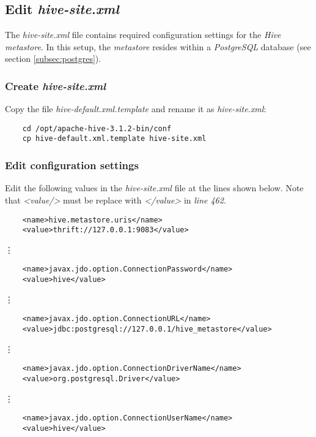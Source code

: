 \documentclass{article}
\begin{document}
  \subsection{Edit \emph{hive-site.xml}}
  The \emph{hive-site.xml} file contains required configuration settings for the
  \emph{Hive metastore}. In this setup, the \emph{metastore} resides within a \emph{PostgreSQL}
  database (see section \ref{subsec:postgres}).

    \subsubsection{Create \emph{hive-site.xml}}
    Copy the file \emph{hive-default.xml.template} and rename it as \emph{hive-site.xml}:
    \begin{verbatim}
    cd /opt/apache-hive-3.1.2-bin/conf
    cp hive-default.xml.template hive-site.xml
    \end{verbatim}
        
    \subsubsection{Edit configuration settings}
    Edit the following values in the \emph{hive-site.xml} file at the lines shown below. Note
    that \emph{\textless value/\textgreater} must be replace with
    \emph{\textless /value\textgreater} in \emph{line 462}.
    \begin{verbatim}
    <name>hive.metastore.uris</name>
    <value>thrift://127.0.0.1:9083</value>
    \end{verbatim}
    \centerline{\vdots}
    \begin{verbatim}
    <name>javax.jdo.option.ConnectionPassword</name>
    <value>hive</value>
    \end{verbatim}
    \centerline{\vdots}
    \begin{verbatim}
    <name>javax.jdo.option.ConnectionURL</name>
    <value>jdbc:postgresql://127.0.0.1/hive_metastore</value>
    \end{verbatim}
    \centerline{\vdots}
    \begin{verbatim}
    <name>javax.jdo.option.ConnectionDriverName</name>
    <value>org.postgresql.Driver</value>
    \end{verbatim}
    \centerline{\vdots}
    \begin{verbatim}
    <name>javax.jdo.option.ConnectionUserName</name>
    <value>hive</value>
    \end{verbatim}
        
\end{document}
